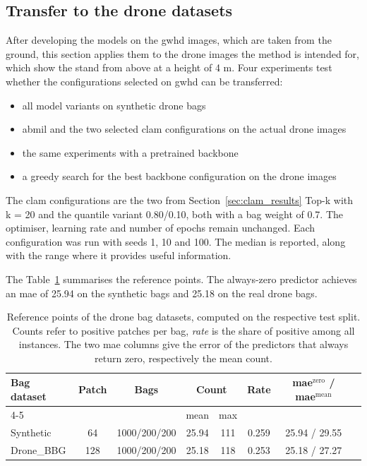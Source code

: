 \documentclass[12pt,parskip = half, DIV=classic,listof=totoc]{scrartcl}
\begin{document}
			\subsection{Transfer to the drone datasets}\label{sec:drone}
			After developing the models on the \ac{gwhd} images, which are taken from the ground, this 
			section applies them to the drone images the method is intended for, which show the 
			stand from above at a height of 4 m. Four experiments test whether the configurations 
			selected on \ac{gwhd} can be transferred:

			\begin{itemize}
				\item all model variants on synthetic drone bags
				\item \ac{abmil} and the two selected \ac{clam} configurations on the actual drone images
				\item the same experiments with a pretrained backbone
				\item a greedy search for the best backbone configuration on the drone images
			\end{itemize}

			The \ac{clam} configurations are the two from Section~\ref{sec:clam_results} Top-k with
			k = 20 and the quantile variant 0.80/0.10, both with a bag weight of 0.7. The optimiser,
			learning rate and number of epochs remain unchanged. Each configuration was run with seeds 1,
			10 and 100. The median is reported, along with the range where it provides useful information.

			The Table~\ref{tab:drone_reference} summarises the reference points. The
			always-zero predictor achieves an \ac{mae} of 25.94 on the synthetic bags and
			25.18 on the real drone bags.

			\begin{table}[htbp]
				\centering
				\footnotesize
				\begin{tabular}{@{}lccccccc@{}}
					\toprule
					\multirow{2}{*}{Bag dataset} & \multirow{2}{*}{Patch} & \multirow{2}{*}{Bags} & \multicolumn{2}{c}{Count} &
						\multirow{2}{*}{Rate} & \multirow{2}{*}{\acs*{mae}$^{\text{zero}}$ / \acs*{mae}$^{\text{mean}}$}  \\
					\cmidrule(lr){4-5}
					& & & mean & max & &  \\
					\midrule
					Synthetic             & 64  & 1000/200/200 & 25.94 & 111 & 0.259 & 25.94 / 29.55  \\
					Drone\_BBG            & 128 & 1000/200/200 & 25.18 & 118 & 0.253 & 25.18 / 27.27  \\
					\bottomrule
				\end{tabular}
				\caption[Reference points of the annotated drone bag datasets, computed on the respective test split]{Reference points of the drone bag datasets, computed on the respective test split. Counts refer to
				positive patches per bag, \emph{rate} is the share of positive among all instances. The two \ac{mae} columns give
				the error of the predictors that always return zero, respectively the mean count.}
				\label{tab:drone_reference}
			\end{table}
\end{document}
